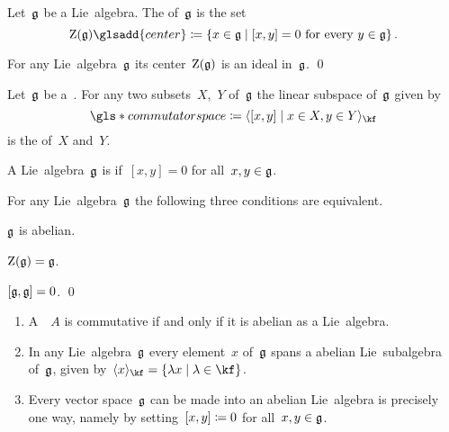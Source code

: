 \begin{definition}
  Let~$\mathfrak{g}$ be a Lie~algebra.
  The  of~$\mathfrak{g}$ is the set
  \[
    \centerlie(\glie)\glsadd{center}
    \defined
    \{
      x \in \glie
    \suchthat
      \text{$[x,y] = 0$ for every~$y \in \glie$}
    \}  \,.
  \]
\end{definition}


\begin{proposition}
  For any Lie~algebra~$\mathfrak{g}$ its center~$\operatorname{Z}(\mathfrak{g})$ is an ideal in~$\mathfrak{g}$.
  \qed
\end{proposition}


\begin{definition}
  Let~$\mathfrak{g}$ be a~\liealgebra{$\kf$}.
  For any two subsets~$X$,~$Y$ of~$\mathfrak{g}$ the linear subspace of~$\mathfrak{g}$ given by
  \[
    \gls*{commutator space}
    \defined
    \gen{
      [x,y]
    \suchthat
      x \in X,
      y \in Y
    }_{\kf}
  \]
  is the  of~$X$ and~$Y$.
\end{definition}


\begin{definition}
  A Lie~algebra~$\mathfrak{g}$ is  if~$[x,y] = 0$ for all~$x, y \in \mathfrak{g}$.
\end{definition}


\begin{proposition}
  For any Lie~algebra~$\mathfrak{g}$ the following three conditions are equivalent.
  \begin{equivalenceslist}
    \item
      $\mathfrak{g}$ is abelian.
    \item
      $\operatorname{Z}(\mathfrak{g}) = \mathfrak{g}$.
    \item
      $[\mathfrak{g}, \mathfrak{g}] = 0$.
    \qed
  \end{equivalenceslist}
\end{proposition}


\begin{examples}
  \leavevmode
  \begin{enumerate}
    \item
      A~{\algebra{$\kf$}}~$A$ is commutative if and only if it is abelian as a Lie~algebra.
    \item
      In any Lie~algebra~$\mathfrak{g}$ every element~$x$ of~$\mathfrak{g}$ spans a {\onedimensional} abelian Lie~subalgebra of~$\mathfrak{g}$, given by~$\gen{x}_{\kf} = \{ \lambda x \suchthat \lambda \in \kf \}$.
    \item
      Every vector space~$\mathfrak{g}$ can be made into an abelian Lie~algebra is precisely one way, namely by setting~$[x, y] \coloneqq 0$ for all~$x, y \in \mathfrak{g}$.
  \end{enumerate}
\end{examples}



